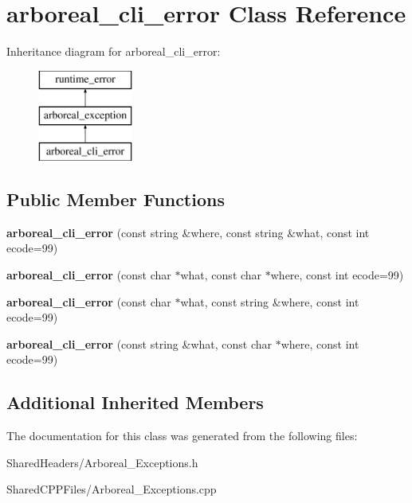 \hypertarget{classarboreal__cli__error}{}\section{arboreal\+\_\+cli\+\_\+error Class Reference}
\label{classarboreal__cli__error}
Inheritance diagram for arboreal\+\_\+cli\+\_\+error\+:\begin{figure}[H]
\begin{center}
\leavevmode
\includegraphics[height=3.000000cm]{d2/d7d/classarboreal__cli__error}
\end{center}
\end{figure}
\subsection*{Public Member Functions}
\begin{DoxyCompactItemize}
\item 
\mbox{\label{classarboreal__cli__error_a39291e6c997b531c712892b9623f938a}} 
{\bfseries arboreal\+\_\+cli\+\_\+error} (const string \&where, const string \&what, const int ecode=99)
\item 
\mbox{\label{classarboreal__cli__error_adecf3ae0818fcdff4d375ef12ea1659e}} 
{\bfseries arboreal\+\_\+cli\+\_\+error} (const char $\ast$what, const char $\ast$where, const int ecode=99)
\item 
\mbox{\label{classarboreal__cli__error_ab9388ea7e89c5232d7dd43d00019fef6}} 
{\bfseries arboreal\+\_\+cli\+\_\+error} (const char $\ast$what, const string \&where, const int ecode=99)
\item 
\mbox{\label{classarboreal__cli__error_a297adfc95de15ebdceae7cf364d05600}} 
{\bfseries arboreal\+\_\+cli\+\_\+error} (const string \&what, const char $\ast$where, const int ecode=99)
\end{DoxyCompactItemize}
\subsection*{Additional Inherited Members}


The documentation for this class was generated from the following files\+:\begin{DoxyCompactItemize}
\item 
Shared\+Headers/Arboreal\+\_\+\+Exceptions.\+h\item 
Shared\+C\+P\+P\+Files/Arboreal\+\_\+\+Exceptions.\+cpp\end{DoxyCompactItemize}
